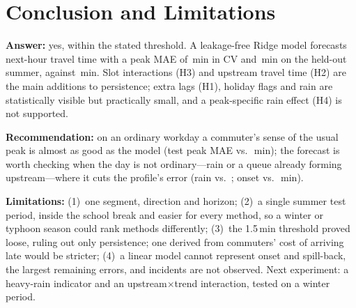 \section{Conclusion and Limitations}
\textbf{Answer:} yes, within the stated threshold. A leakage-free Ridge model forecasts next-hour
travel time with a peak MAE of \,min in CV and \,min on the
held-out summer, against \,min. Slot interactions (H3) and upstream travel time
(H2) are the main additions to persistence; extra lags (H1), holiday flags and rain are
statistically visible but practically small, and a peak-specific rain effect (H4) is not supported.

\textbf{Recommendation:} on an ordinary workday a commuter's sense of the usual peak is almost as
good as the model (test peak MAE  vs.\ \,min); the
forecast is worth checking when the day is not ordinary---rain or a queue already
forming upstream---where it cuts the profile's error (rain  vs.\
; onset  vs.\ \,min).

\textbf{Limitations:} (1)~one segment, direction and horizon; (2)~a single summer test period,
inside the school break and easier for every method, so a winter or typhoon season could rank
methods differently; (3)~the 1.5\,min threshold proved loose, ruling out only persistence; one
derived from commuters' cost of arriving late would be stricter; (4)~a linear model cannot
represent onset and spill-back, the largest remaining errors, and incidents are not observed.
Next experiment: a heavy-rain indicator and an upstream$\times$\allowbreak trend interaction, tested
on a winter period.
